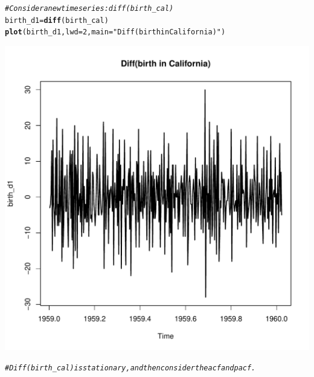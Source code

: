 \documentclass[10pt]{article}\usepackage[]{graphicx}\usepackage[]{color}
\makeatletter
\def\maxwidth{ %
  \ifdim\Gin@nat@width>\linewidth
    \linewidth
  \else
    \Gin@nat@width
  \fi
}
\newcommand{\hlnum}[1]{\textcolor[rgb]{0.686,0.059,0.569}{#1}}%
\newcommand{\hlstr}[1]{\textcolor[rgb]{0.192,0.494,0.8}{#1}}%
\newcommand{\hlcom}[1]{\textcolor[rgb]{0.678,0.584,0.686}{\textit{#1}}}%
\newcommand{\hlstd}[1]{\textcolor[rgb]{0.345,0.345,0.345}{#1}}%
\newcommand{\hlkwb}[1]{\textcolor[rgb]{0.69,0.353,0.396}{#1}}%
\newcommand{\hlkwc}[1]{\textcolor[rgb]{0.333,0.667,0.333}{#1}}%
\newcommand{\hlkwd}[1]{\textcolor[rgb]{0.737,0.353,0.396}{\textbf{#1}}}%
\newenvironment{kframe}{%
 \def\at@end@of@kframe{}%
 \ifinner\ifhmode%
  \def\at@end@of@kframe{\end{minipage}}%
  \begin{minipage}{\columnwidth}%
 \fi\fi%
 \def\FrameCommand##1{\hskip\@totalleftmargin \hskip-\fboxsep
 \colorbox{shadecolor}{##1}\hskip-\fboxsep
     \hskip-\linewidth \hskip-\@totalleftmargin \hskip\columnwidth}%
 \MakeFramed {\advance\hsize-\width
   \@totalleftmargin\z@ \linewidth\hsize
   \@setminipage}}%
 {\par\unskip\endMakeFramed%
 \at@end@of@kframe}
\newenvironment{knitrout}{}{} %
\makeatother
\begin{document}
\begin{knitrout}
\color{fgcolor}\begin{kframe}
\begin{alltt}
\hlcom{#Consider a new time series: diff(birth_cal)}
\hlstd{birth_d1} \hlkwb{=} \hlkwd{diff}\hlstd{(birth_cal)}
\hlkwd{plot}\hlstd{(birth_d1,}\hlkwc{lwd} \hlstd{=} \hlnum{2}\hlstd{,} \hlkwc{main} \hlstd{=} \hlstr{"Diff(birth in California)"}\hlstd{)}
\end{alltt}
\end{kframe}
\includegraphics[width=\maxwidth]{figure/unnamed-chunk-9-1} 
\begin{kframe}\begin{alltt}
\hlcom{#Diff(birth_cal) is stationary, and then consider the acf and pacf.}


\end{alltt}
\end{kframe}
\end{knitrout}
\end{document}
